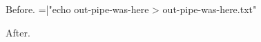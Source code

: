 \documentclass{article}
\begin{document}
Before.
\immediate{}=|"echo out-pipe-was-here > out-pipe-was-here.txt"
\immediate{}
\immediate{}
After.
\end{document}
